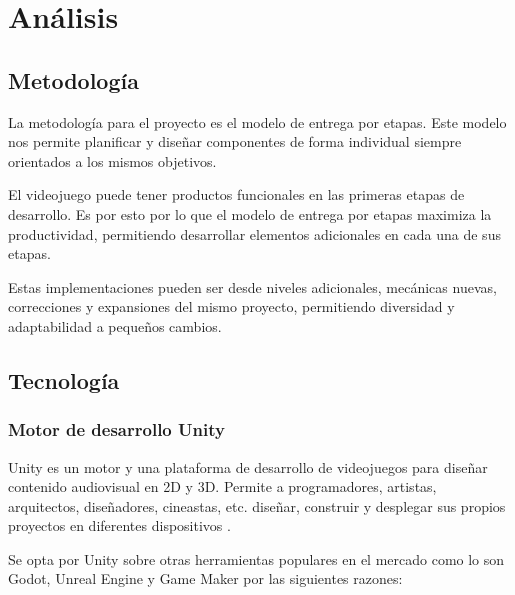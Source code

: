 \documentclass[12pt,twoside]{article}
\begin{document}
	\clearpage
	\section{Análisis}
	
	\subsection{Metodología}

	La metodología para el proyecto es el modelo de entrega por etapas. Este modelo nos permite planificar y diseñar componentes de forma individual siempre orientados a los mismos objetivos.

	El videojuego puede tener productos funcionales en las primeras etapas de desarrollo. Es por esto por lo que el modelo de entrega por etapas maximiza la productividad, permitiendo desarrollar elementos adicionales en cada una de sus etapas. 
	
	Estas implementaciones pueden ser desde niveles adicionales, mecánicas nuevas, correcciones y expansiones del mismo proyecto, permitiendo diversidad y adaptabilidad a pequeños cambios.
	
	\subsection{Tecnología}	%

	\subsubsection{Motor de desarrollo Unity}
	Unity es un motor y una plataforma de desarrollo de videojuegos para diseñar contenido audiovisual en 2D y 3D. Permite a programadores, artistas, arquitectos, diseñadores, cineastas, etc. diseñar, construir y desplegar sus propios proyectos en diferentes dispositivos \cite{app: unity}.

Se opta por Unity sobre otras herramientas populares en el mercado como lo son Godot, Unreal Engine y Game Maker por las siguientes razones:
\end{document}
